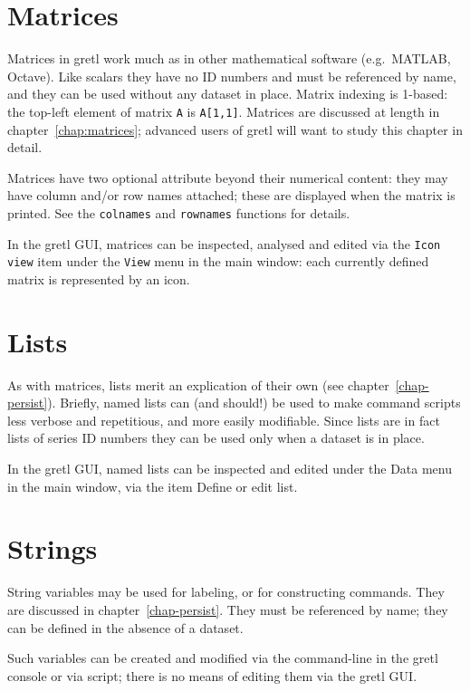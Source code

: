 \section{Matrices}
\label{sec:Matrices}

Matrices in gretl work much as in other mathematical software (e.g.\
\textsf{MATLAB}, \textsf{Octave}). Like scalars they have no ID
numbers and must be referenced by name, and they can be used without
any dataset in place. Matrix indexing is 1-based: the top-left element
of matrix \texttt{A} is \texttt{A[1,1]}.  Matrices are discussed at
length in chapter~\ref{chap:matrices}; advanced users of gretl will
want to study this chapter in detail.

Matrices have two optional attribute beyond their numerical content:
they may have column and/or row names attached; these are displayed
when the matrix is printed. See the \texttt{colnames} and
\texttt{rownames} functions for details.

In the gretl GUI, matrices can be inspected, analysed and edited via
the \texttt{Icon view} item under the \texttt{View} menu in the main
window: each currently defined matrix is represented by an icon.

\section{Lists}
\label{sec:Lists}

As with matrices, lists merit an explication of their own (see
chapter~\ref{chap-persist}).  Briefly, named lists can (and should!)
be used to make command scripts less verbose and repetitious, and
more easily modifiable. Since lists are in fact lists of series ID
numbers they can be used only when a dataset is in place.

In the gretl GUI, named lists can be inspected and edited under the
\textsf{Data} menu in the main window, via the item \textsf{Define or
  edit list}.

\section{Strings}
\label{sec:Strings}

String variables may be used for labeling, or for constructing
commands. They are discussed in chapter~\ref{chap-persist}. They must
be referenced by name; they can be defined in the absence of a
dataset.

Such variables can be created and modified via the command-line in
the gretl console or via script; there is no means of editing them
via the gretl GUI.


